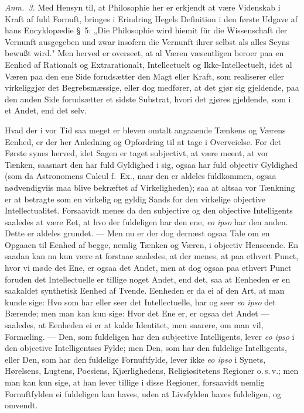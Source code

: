 \documentclass[12pt,a4paper]{book}
\newcommand{\apage}[1]{\marginnote{\footnotesize\textit{[#1]}}}
\begin{document}
{\small\emph{Anm.~3.} Med Hensyn til, at Philosophie her er erkjendt at være
Videnskab i Kraft af fuld Fornuft, bringes i Erindring Hegels Definition i den
første Udgave af hans Encyklopædie \S~5: „Die Philosophie wird hiemit für die
Wissenschaft der Vernunft ausgegeben und zwar insofern die Vernunft ihrer selbst als
alles Seyns bewußt wird." Men herved er overseet, at al Væren væsentligen beroer paa
en Eenhed af Rationalt og Extrarationalt, Intellectuelt og Ikke-Intellectuelt, idet
al Væren paa den ene Side forudsætter den Magt eller Kraft, som realiserer eller
virkeliggjør det Begrebsmæssige, eller dog medfører, at det gjør sig gjeldende, paa
den anden Side forudsætter et sidste Substrat, hvori det gjøres gjeldende, som i et
Andet, end det selv.\par}
  \apage{51}
{\small

Hvad der i vor Tid saa meget er bleven omtalt angaaende Tænkens og Værens
Eenhed, er der her Anledning og Opfordring til at tage i Overveielse. For det Første
synes herved, idet Sagen er taget subjectivt, at være meent, at vor Tænken, saasnart
den har fuld Gyldighed i sig, ogsaa har fuld objectiv Gyldighed (som da Astronomens
Calcul f.\ Ex., naar den er aldeles fuldkommen, ogsaa nødvendigviis maa blive
bekræftet af Virkeligheden); saa at altsaa vor Tænkning er at betragte som en
virkelig og gyldig Sands for den virkelige objective Intellectualitet. Forsaavidt
menes da den subjective og den objective Intelligents saaledes at være Eet, at hvo
der fuldeligen har den ene, \textit{eo ipso} har den anden. Dette er aldeles
grundet. --- Men nu er der dog dernæst ogsaa Tale om en Opgaaen til Eenhed af begge,
nemlig Tænken og Væren, i objectiv Henseende. En saadan kan nu kun være at forstaae
saaledes, at der menes, at paa ethvert Punct, hvor vi møde det Ene, er ogsaa det
Andet, men at dog ogsaa paa ethvert Punct foruden det Intellectuelle er tillige
noget Andet, end det, saa at Eenheden er en saakaldet synthetisk Eenhed af Tvende.
Eenheden er da ei af den Art, at man kunde sige: Hvo som har eller seer det
Intellectuelle, har og seer \textit{eo ipso} det Bærende; men man kan kun sige: Hvor
det Ene er, er ogsaa det Andet --- saaledes, at Eenheden ei er at kalde Identitet,
men snarere, om man vil, Formæling. --- Den, som fuldeligen har den subjective
Intelligents, lever \textit{eo ipso} i den objective Intelligentses Fylde; men Den,
som har den fuldelige Intelligents, eller Den, som har den fuldelige Fornuftfylde,
lever ikke \textit{eo ipso} i Synets, Hørelsens, Lugtens, Poesiens, Kjærlighedens,
Religiøsitetens Regioner o.\,s.\,v.; men man kan kun sige, at han lever tillige i
disse Regioner, forsaavidt nemlig Fornuftfylden ei fuldeligen kan haves, uden at
Livsfylden haves fuldeligen, og omvendt.\par}
\end{document}
